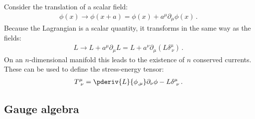     \begin{definition}
        Consider the translation of a scalar field:
        \begin{gather}
            \phi(x)\longrightarrow\phi(x+a) = \phi(x) + a^\mu\partial_\mu\phi(x)\,.
        \end{gather}
        Because the Lagrangian is a scalar quantity, it transforms in the same way as the fields:
        \begin{gather}
            L\longrightarrow L + a^\mu\partial_\mu L = L + a^\nu\partial_\mu(L\delta^\mu_{\ \nu})\,.
        \end{gather}
        On an $n$-dimensional manifold this leads to the existence of $n$ conserved currents. These can be used to define the stress-energy tensor:
        \begin{gather}
            \label{field:stress_energy_tensor}
            T^\mu_{\ \nu} = \pderiv{L}{\phi_{,\mu}}\partial_\nu\phi - L\delta^\mu_{\ \nu}\,.
        \end{gather}
    \end{definition}

\subsection{Gauge algebra}

